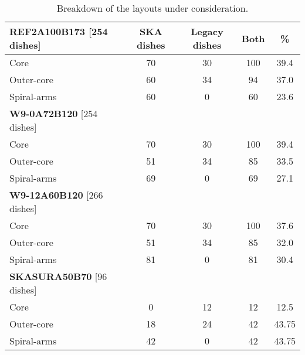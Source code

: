 \documentclass[sfheadings,a4paper,times,9pt,floats,floatfix]{article}
\begin{document}
\begin{table}[H]
\centering
 \tiny{
 \begin{tabular}{l|cccc}\hline
 {\bf REF2A100B173} [254 dishes] & SKA dishes&  Legacy dishes & Both & \% \\\hline\hline
  Core & 70 & 30 & 100 & 39.4 \\
 Outer-core & 60 & 34 & 94 & 37.0 \\
 Spiral-arms & 60 & 0 & 60 & 23.6 \\\hline\hline
  {\bf W9-0A72B120} [254 dishes] &  & &  & \\\hline\hline
  Core & 70 & 30 & 100 & 39.4 \\
 Outer-core & 51 & 34 & 85 & 33.5 \\
 Spiral-arms & 69 & 0 & 69 & 27.1 \\\hline\hline
  {\bf W9-12A60B120} [266 dishes] &  & &  & \\\hline\hline
  Core & 70 & 30 & 100 & 37.6 \\
 Outer-core & 51 & 34 & 85 & 32.0 \\
 Spiral-arms & 81 & 0 & 81 & 30.4 \\\hline\hline
   {\bf SKASURA50B70} [96 dishes] &  & &  & \\\hline\hline
  Core & 0 & 12 & 12 & 12.5 \\
 Outer-core & 18 & 24 & 42 & 43.75 \\
 Spiral-arms & 42 & 0 & 42 & 43.75 \\\hline\hline
 \end{tabular}}
 \caption{Breakdown of the layouts under consideration.}\label{tab:lay}
\end{table}
\end{document}
